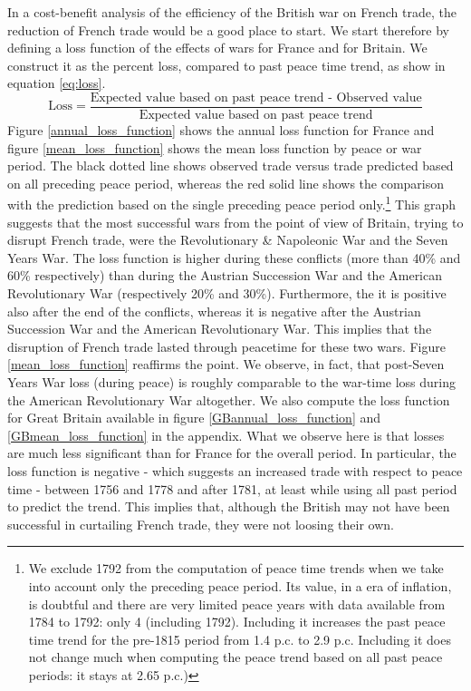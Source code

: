 \documentclass[12pt,a4paper,notitlepage,english]{article}
\begin{document}
In a cost-benefit analysis of the efficiency of the British war on French trade, the reduction of French trade would be a good place to start. We start therefore by defining a loss function of the effects of wars for France and for Britain.
We construct it as the percent loss, compared to past peace time trend, as show in equation \ref{eq:loss}.
\begin{equation*}
\label{eq:loss}
\text{Loss} = \frac{\text{Expected value based on past peace trend - Observed value}}{\text{Expected value based on past peace trend}}
\end{equation*}
Figure \ref{annual_loss_function} shows the annual loss function for France and figure \ref{mean_loss_function} shows the mean loss function by peace or war period.
The black dotted line shows observed trade versus trade predicted based on all preceding peace period, whereas the red solid line shows the comparison with the prediction based on the single preceding peace period only.\footnote{We exclude 1792 from the computation of peace time trends when we take into account only the preceding peace period. Its value, in a era of inflation, is doubtful and there are very limited peace years with data available from 1784 to 1792: only 4 (including 1792). Including it increases the past peace time trend for the pre-1815 period from 1.4 p.c. to 2.9 p.c. Including it does not change much when computing the peace trend based on all past peace periods: it stays at 2.65 p.c.)}
This graph suggests that the most successful wars from the point of view of Britain, trying to disrupt French trade, were the Revolutionary \& Napoleonic War and the Seven Years War.
The loss function is higher during these conflicts (more than 40\% and 60\% respectively) than during the Austrian Succession War and the American Revolutionary War (respectively 20\% and 30\%).
Furthermore, the it is positive also after the end of the conflicts, whereas it is negative after the Austrian Succession War and the American Revolutionary War. This implies that the disruption of French trade lasted through peacetime for these two wars. Figure \ref{mean_loss_function} reaffirms the point. We observe, in fact, that post-Seven Years War loss (during peace) is roughly comparable to the war-time loss during the American Revolutionary War altogether.
We also compute the loss function for Great Britain available in figure \ref{GBannual_loss_function} and \ref{GBmean_loss_function} in the appendix. What we observe here is that losses are much less significant than for France for the overall period. In particular, the loss function is negative - which suggests an increased trade with respect to peace time - between 1756 and 1778 and after 1781, at least while using all past period to predict the trend. This implies that, although the British may not have been successful in curtailing French trade, they were not loosing their own.
\end{document}
